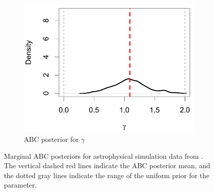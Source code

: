 \documentclass[12pt]{article}
\begin{document}
\begin{figure}[htbp]
\begin{subfigure}{0.32\textwidth}
\includegraphics[width = .95\textwidth]{figures/bate_marginal_gamma.pdf} 
\caption{ABC posterior for $\gamma$}\label{subfig:bate_gamma}
\end{subfigure}
\caption{Marginal ABC posteriors for astrophysical simulation data from \cite{Bate2012}.  The vertical dashed red lines indicate the ABC posterior mean, and the dotted gray lines indicate the range of the uniform prior for the parameter.  
 }
   \label{fig:abc_bate_posterior}
\end{figure}
\end{document}
